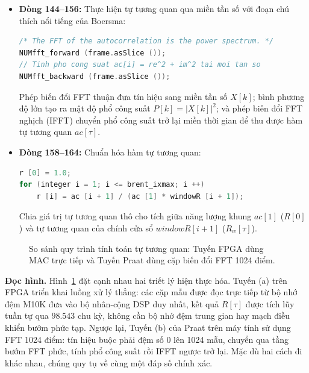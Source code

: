 \begin{itemize}[leftmargin=1.5em, itemsep=2pt]
    \item \textbf{Dòng 144--156:} Thực hiện tự tương quan qua miền tần số với đoạn chú thích nổi tiếng của Boersma:
    \begin{lstlisting}[language=C++, numbers=none]
/* The FFT of the autocorrelation is the power spectrum. */
NUMfft_forward (frame.asSlice ());
// Tinh pho cong suat ac[i] = re^2 + im^2 tai moi tan so
NUMfft_backward (frame.asSlice ());
    \end{lstlisting}
    Phép biến đổi FFT thuận đưa tín hiệu sang miền tần số $X[k]$; bình phương độ lớn tạo ra mật độ phổ công suất $P[k] = |X[k]|^2$; và phép biến đổi FFT nghịch (IFFT) chuyển phổ công suất trở lại miền thời gian để thu được hàm tự tương quan $ac[\tau]$.
    \item \textbf{Dòng 158--164:} Chuẩn hóa hàm tự tương quan:
    \begin{lstlisting}[language=C++, numbers=none]
r [0] = 1.0;
for (integer i = 1; i <= brent_ixmax; i ++)
    r [i] = ac [i + 1] / (ac [1] * windowR [i + 1]);
    \end{lstlisting}
    Chia giá trị tự tương quan thô cho tích giữa năng lượng khung $ac[1]$ ($R[0]$) và tự tương quan của chính cửa sổ $windowR[i+1]$ ($R_w[\tau]$).
\end{itemize}

\begin{figure}[H]
\centering
\resizebox{0.98\linewidth}{!}{}
\caption{So sánh quy trình tính toán tự tương quan: Tuyến FPGA dùng MAC trực tiếp và Tuyến Praat dùng cặp biến đổi FFT 1024 điểm.}
\label{fig:ch07_direct_mac_vs_fft}
\end{figure}

\textbf{Đọc hình.} Hình~\ref{fig:ch07_direct_mac_vs_fft} đặt cạnh nhau hai triết lý hiện thực hóa. Tuyến (a) trên FPGA triển khai luồng xử lý thẳng: các cặp mẫu được đọc trực tiếp từ bộ nhớ đệm M10K đưa vào bộ nhân-cộng DSP duy nhất, kết quả $R[\tau]$ được tích lũy tuần tự qua $98.543\text{ chu kỳ}$, không cần bộ nhớ đệm trung gian hay mạch điều khiển bướm phức tạp. Ngược lại, Tuyến (b) của Praat trên máy tính sử dụng FFT 1024 điểm: tín hiệu buộc phải đệm số 0 lên 1024 mẫu, chuyển qua tầng bướm FFT phức, tính phổ công suất rồi IFFT ngược trở lại. Mặc dù hai cách đi khác nhau, chúng quy tụ về cùng một đáp số chính xác.

